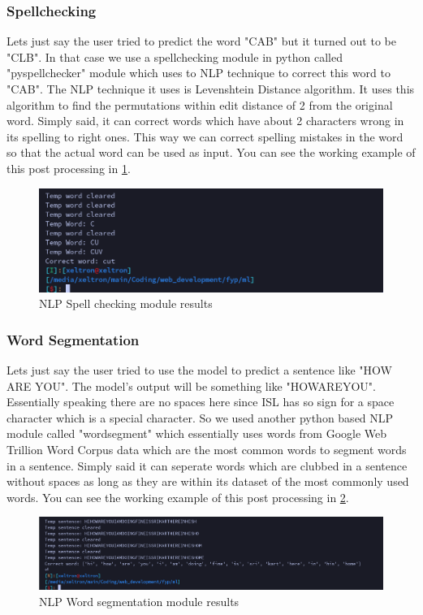 \documentclass[12pt,a4paper]{report}
\begin{document}
\subsubsection{Spellchecking}
Lets just say the user tried to predict the word "CAB" but it turned out to be "CLB". In that case we use a spellchecking module in python called "pyspellchecker" module which uses to NLP technique to correct this word to "CAB". The NLP technique it uses is Levenshtein Distance algorithm. It uses this algorithm to find the permutations within edit distance of 2 from the original word. Simply said, it can correct words which have about 2 characters wrong in its spelling to right ones. This way we can correct spelling mistakes in the word so that the actual word can be used as input. You can see the working example of this post processing in \ref{Spell_check}.
\begin{figure}[htbp]
	\centerline{\includegraphics[scale=0.4]{spell_check.png}}
	\caption{NLP Spell checking module results}
	\label{Spell_check}
\end{figure}

\subsubsection{Word Segmentation}
Lets just say the user tried to use the model to predict a sentence like "HOW ARE YOU". The model's output will be something like "HOWAREYOU". Essentially speaking there are no spaces here since ISL has so sign for a space character which is a special character. So we used another python based NLP module called "wordsegment" which essentially uses words from Google Web Trillion Word Corpus data which are the most common words to segment words in a sentence. Simply said it can seperate words which are clubbed in a sentence without spaces as long as they are within its dataset of the most commonly used words. You can see the working example of this post processing in \ref{Word_segment}.
\begin{figure}[htbp]
	\centerline{\includegraphics[scale=0.25]{word_segment.png}}
	\caption{NLP Word segmentation module results}
	\label{Word_segment}
\end{figure}
\end{document}
